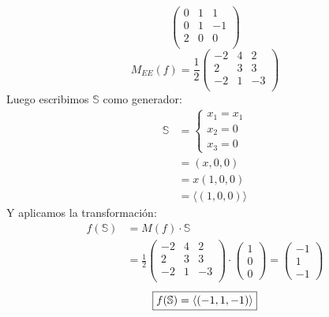 \documentclass[../practica.root.tex]{subfiles}
\begin{document}
\begin{enumerate}
\[\begin{pmatrix}
                  0 & 1 & 1  \\
                  0 & 1 & -1 \\
                  2 & 0 & 0  \\
              \end{pmatrix}
          \] \[
              M_{EE}(f)  =
              \frac{1}{2}
              \begin{pmatrix}
                  -2 & 4 & 2  \\
                  2  & 3 & 3  \\
                  -2 & 1 & -3 \\
              \end{pmatrix}
          \]
          Luego escribimos $\mathbb{S}$ como generador:
          \begin{align*}
              \mathbb{S} & =\begin{cases}
                  x_1=x_1 \\
                  x_2=0   \\
                  x_3=0
              \end{cases} \\
                         & =(x, 0, 0)                  \\
                         & =x(1, 0, 0)                 \\
                         & =\langle(1, 0, 0)\rangle
          \end{align*}
          Y aplicamos la transformación:
          \begin{align*}
              f(\mathbb{S}) & =M(f)\cdot\mathbb{S}                                                                               \\
                            & =\frac{1}{2}\begin{pmatrix}
                  -2 & 4 & 2  \\
                  2  & 3 & 3  \\
                  -2 & 1 & -3 \\
              \end{pmatrix}\cdot\begin{pmatrix}
                  1 \\
                  0 \\
                  0
              \end{pmatrix} = \begin{pmatrix}
                  -1 \\
                  1  \\
                  -1
              \end{pmatrix}
          \end{align*}
          \[ \boxed{f(\S) = \langle(-1,1,-1)\rangle} \]



\end{enumerate}
\end{document}

